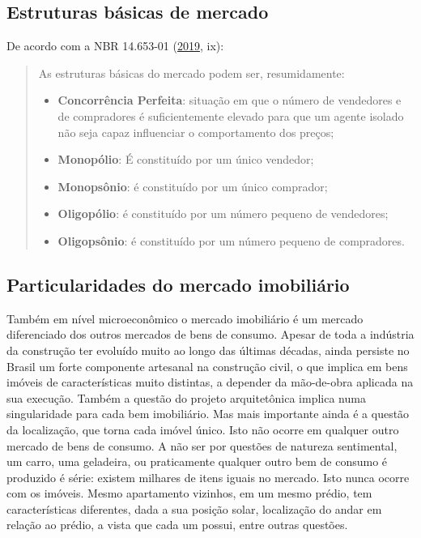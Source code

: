 \documentclass[
	12pt,				%
	oneside,			%
	a4paper,			%
	chapter=TITLE,		%
	section=TITLE,		%
	english,			%
	brazil				%
	]{abntex2}
\begin{document}
\hypertarget{estruturas-buxe1sicas-de-mercado}{%
\subsection{Estruturas básicas de mercado}\label{estruturas-buxe1sicas-de-mercado}}

De acordo com a NBR 14.653-01 (\protect\hyperlink{ref-NBR1465301}{2019}, ix):
\begin{quote}
As estruturas básicas do mercado podem ser, resumidamente:
\begin{itemize}
\item
  \textbf{Concorrência Perfeita}: situação em que o número de vendedores e de
  compradores é suficientemente elevado para que um agente isolado não seja
  capaz influenciar o comportamento dos preços;
\item
  \textbf{Monopólio}: É constituído por um único vendedor;
\item
  \textbf{Monopsônio}: é constituído por um único comprador;
\item
  \textbf{Oligopólio}: é constituído por um número pequeno de vendedores;
\item
  \textbf{Oligopsônio}: é constituído por um número pequeno de compradores.
\end{itemize}
\end{quote}
\hypertarget{particularidades-do-mercado-imobiliuxe1rio}{%
\subsection{Particularidades do mercado imobiliário}\label{particularidades-do-mercado-imobiliuxe1rio}}

Também em nível microeconômico o mercado imobiliário é um mercado diferenciado
dos outros mercados de bens de consumo. Apesar de toda a indústria da construção
ter evoluído muito ao longo das últimas décadas, ainda persiste no Brasil um
forte componente artesanal na construção civil, o que implica em bens imóveis
de características muito distintas, a depender da mão-de-obra aplicada na sua
execução. Também a questão do projeto arquitetônica implica numa singularidade
para cada bem imobiliário. Mas mais importante ainda é a questão da localização,
que torna cada imóvel único. Isto não ocorre em qualquer outro mercado de bens
de consumo. A não ser por questões de natureza sentimental, um carro, uma
geladeira, ou praticamente qualquer outro bem de consumo é produzido é série:
existem milhares de itens iguais no mercado. Isto nunca ocorre com os imóveis.
Mesmo apartamento vizinhos, em um mesmo prédio, tem características diferentes,
dada a sua posição solar, localização do andar em relação ao prédio, a vista
que cada um possui, entre outras questões.
\end{document}
